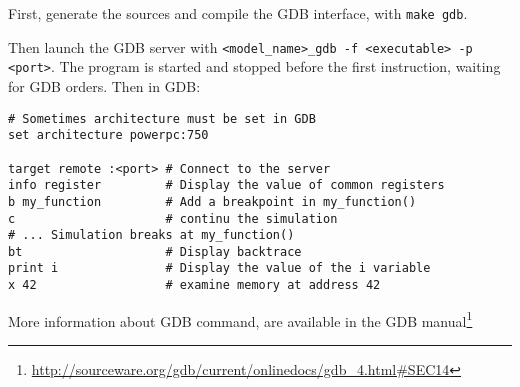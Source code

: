 First, generate the sources and compile the GDB interface, with {\tt make gdb}.

Then launch the GDB server with {\tt <model\_name>\_gdb -f <executable> -p
<port>}. The program is started and stopped before the first instruction,
waiting for GDB orders. Then in GDB:
\begin{verbatim}
# Sometimes architecture must be set in GDB
set architecture powerpc:750

target remote :<port> # Connect to the server
info register         # Display the value of common registers
b my_function         # Add a breakpoint in my_function()
c                     # continu the simulation
# ... Simulation breaks at my_function()
bt                    # Display backtrace
print i               # Display the value of the i variable
x 42                  # examine memory at address 42
\end{verbatim}

More information about GDB command, are available in the GDB
manual\footnote{\url{http://sourceware.org/gdb/current/onlinedocs/gdb_4.html\#SEC14}}
